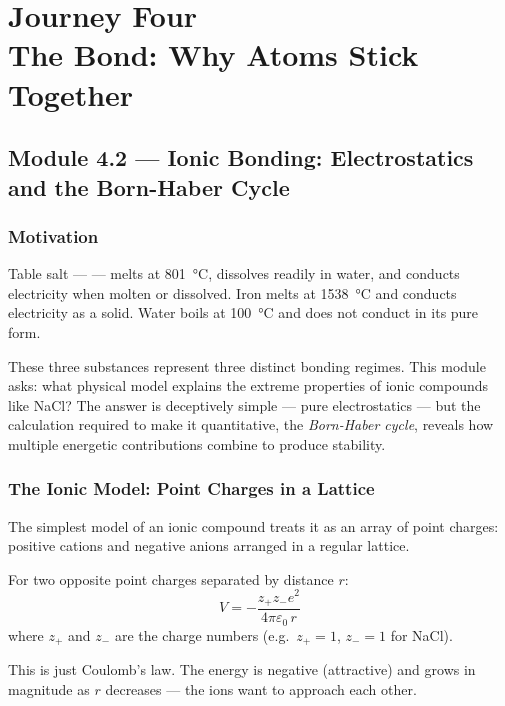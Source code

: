 \documentclass[12pt, a4paper]{book}
\newcommand{\newterm}[1]{\textit{\textcolor{DiscoveryColor}{#1}}}
\begin{document}
\setcounter{chapter}{3}
\chapter[Journey 4 --- The Bond]{Journey Four\\[8pt]
  \textcolor{ModuleColor}{\large The Bond: Why Atoms Stick Together}}
\setcounter{section}{1}

\section{Module 4.2 --- Ionic Bonding: Electrostatics and the Born-Haber Cycle}

\subsection*{Motivation}

Table salt —  — melts at \SI{801}{\degreeCelsius},
dissolves readily in water, and conducts electricity when
molten or dissolved.
Iron melts at \SI{1538}{\degreeCelsius} and conducts electricity as a solid.
Water boils at \SI{100}{\degreeCelsius} and does not conduct in its pure form.

These three substances represent three distinct bonding regimes.
This module asks: what physical model explains the extreme
properties of ionic compounds like NaCl?
The answer is deceptively simple --- pure electrostatics ---
but the calculation required to make it quantitative,
the \newterm{Born-Haber cycle}, reveals how multiple energetic
contributions combine to produce stability.

\subsection{The Ionic Model: Point Charges in a Lattice}

The simplest model of an ionic compound treats it as an
array of point charges: positive cations and negative anions
arranged in a regular lattice.

For two opposite point charges separated by distance $r$:
\[
  V = -\frac{z_+ z_- e^2}{4\pi\varepsilon_0\, r}
\]
where $z_+$ and $z_-$ are the charge numbers (e.g.\ $z_+=1$, $z_-=1$ for NaCl).

This is just Coulomb's law.
The energy is negative (attractive) and grows in magnitude
as $r$ decreases — the ions want to approach each other.
\end{document}
